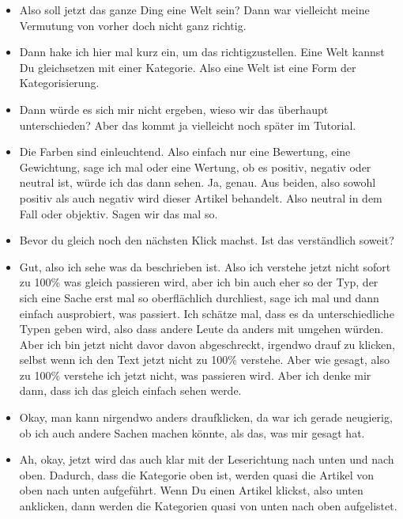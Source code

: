 {\begin{itemize}[]
    Also dieser lilane Teil könnte jetzt eine Welt und einer Kategorie zugeordnet sein, so wie ich es jetzt verstanden habe.
    \item {} Also soll jetzt das ganze Ding eine Welt sein?
    Dann war vielleicht meine Vermutung von vorher doch nicht ganz richtig.
    \item {} Dann hake ich hier mal kurz ein, um das richtigzustellen.
    Eine Welt kannst Du gleichsetzen mit einer Kategorie.
    Also eine Welt ist eine Form der Kategorisierung.
    \item {} Dann würde es sich mir nicht ergeben, wieso wir das überhaupt unterschieden? 
    Aber das kommt ja vielleicht noch später im Tutorial.
    \item {} Die Farben sind einleuchtend. 
    Also einfach nur eine Bewertung, eine Gewichtung, sage ich mal oder eine Wertung, ob es positiv, negativ oder neutral ist, würde ich das dann sehen.
    Ja, genau.
    Aus beiden, also sowohl positiv als auch negativ wird dieser Artikel behandelt. 
    Also neutral in dem Fall oder objektiv.
    Sagen wir das mal so.
    \item {} Bevor du gleich noch den nächsten Klick machst.
    Ist das verständlich soweit?
    \item {} Gut, also ich sehe was da beschrieben ist.
    Also ich verstehe jetzt nicht sofort zu 100\% was gleich passieren wird, aber ich bin auch eher so der Typ, der sich eine Sache erst mal so oberflächlich durchliest, sage ich mal und dann einfach ausprobiert, was passiert.
    Ich schätze mal, dass es da unterschiedliche Typen geben wird, also dass andere Leute da anders mit umgehen würden.
    Aber ich bin jetzt nicht davor davon abgeschreckt, irgendwo drauf zu klicken, selbst wenn ich den Text jetzt nicht zu 100\% verstehe.
    Aber wie gesagt, also zu 100\% verstehe ich jetzt nicht, was passieren wird.
    Aber ich denke mir dann, dass ich das gleich einfach sehen werde.
    \item {} Okay, man kann nirgendwo anders draufklicken, da war ich gerade neugierig, ob ich auch andere Sachen machen könnte, als das, was mir gesagt hat.
    \item {} Ah, okay, jetzt wird das auch klar mit der Leserichtung nach unten und nach oben.
    Dadurch, dass die Kategorie oben ist, werden quasi die Artikel von oben nach unten aufgeführt.
    Wenn Du einen Artikel klickst, also unten anklicken, dann werden die Kategorien quasi von unten nach oben aufgelistet.

\end{itemize}}
